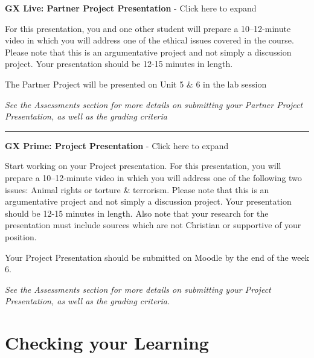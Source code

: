 \documentclass[
]{book}
\begin{document}
\begin{assessment}
\textbf{GX Live: Partner Project Presentation} - Click here to expand

For this presentation, you and one other student will prepare a 10--12-minute video in which you will address one of the ethical issues covered in the course. Please note that this is an argumentative project and not simply a discussion project. Your presentation should be 12-15 minutes in length.

The Partner Project will be presented on Unit 5 \& 6 in the lab session

\emph{See the Assessments section for more details on submitting your Partner Project Presentation, as well as the grading criteria}

\begin{center}\rule{0.5\linewidth}{0.5pt}\end{center}

\textbf{GX Prime: Project Presentation} - Click here to expand

Start working on your Project presentation. For this presentation, you will prepare a 10--12-minute video in which you will address one of the following two issues: Animal rights or torture \& terrorism. Please note that this is an argumentative project and not simply a discussion project. Your presentation should be 12-15 minutes in length. Also note that your research for the presentation must include sources which are not Christian or supportive of your position.

Your Project Presentation should be submitted on Moodle by the end of the week 6.

\emph{See the Assessments section for more details on submitting your Project Presentation, as well as the grading criteria.}
\end{assessment}

\hypertarget{checking-your-learning-5}{%
\section*{Checking your Learning}\label{checking-your-learning-5}}
\end{document}

